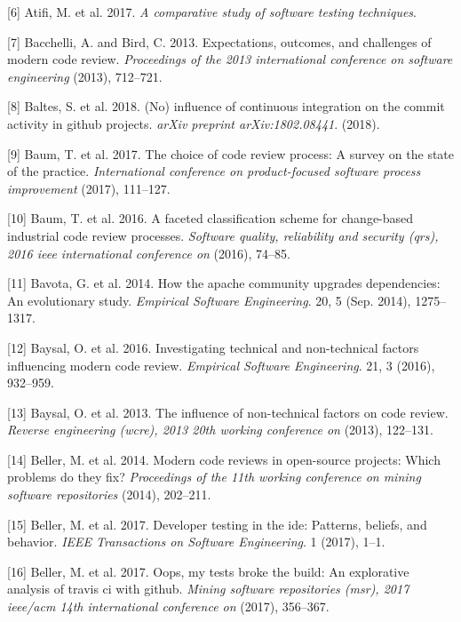 \documentclass[]{book}
\begin{document}
\hypertarget{ref-atifi2017}{}
{[}6{]} Atifi, M. et al. 2017. \emph{A comparative study of software
testing techniques}.

\hypertarget{ref-bacchelli2013expectations}{}
{[}7{]} Bacchelli, A. and Bird, C. 2013. Expectations, outcomes, and
challenges of modern code review. \emph{Proceedings of the 2013
international conference on software engineering} (2013), 712--721.

\hypertarget{ref-baltes2018no}{}
{[}8{]} Baltes, S. et al. 2018. (No) influence of continuous integration
on the commit activity in github projects. \emph{arXiv preprint
arXiv:1802.08441}. (2018).

\hypertarget{ref-baum2017choice}{}
{[}9{]} Baum, T. et al. 2017. The choice of code review process: A
survey on the state of the practice. \emph{International conference on
product-focused software process improvement} (2017), 111--127.

\hypertarget{ref-baum2016faceted}{}
{[}10{]} Baum, T. et al. 2016. A faceted classification scheme for
change-based industrial code review processes. \emph{Software quality,
reliability and security (qrs), 2016 ieee international conference on}
(2016), 74--85.

\hypertarget{ref-Bavota2014}{}
{[}11{]} Bavota, G. et al. 2014. How the apache community upgrades
dependencies: An evolutionary study. \emph{Empirical Software
Engineering}. 20, 5 (Sep. 2014), 1275--1317.

\hypertarget{ref-baysal2016investigating}{}
{[}12{]} Baysal, O. et al. 2016. Investigating technical and
non-technical factors influencing modern code review. \emph{Empirical
Software Engineering}. 21, 3 (2016), 932--959.

\hypertarget{ref-baysal2013influence}{}
{[}13{]} Baysal, O. et al. 2013. The influence of non-technical factors
on code review. \emph{Reverse engineering (wcre), 2013 20th working
conference on} (2013), 122--131.

\hypertarget{ref-beller2014modern}{}
{[}14{]} Beller, M. et al. 2014. Modern code reviews in open-source
projects: Which problems do they fix? \emph{Proceedings of the 11th
working conference on mining software repositories} (2014), 202--211.

\hypertarget{ref-beller2017developer}{}
{[}15{]} Beller, M. et al. 2017. Developer testing in the ide: Patterns,
beliefs, and behavior. \emph{IEEE Transactions on Software Engineering}.
1 (2017), 1--1.

\hypertarget{ref-beller2017oops}{}
{[}16{]} Beller, M. et al. 2017. Oops, my tests broke the build: An
explorative analysis of travis ci with github. \emph{Mining software
repositories (msr), 2017 ieee/acm 14th international conference on}
(2017), 356--367.
\end{document}
